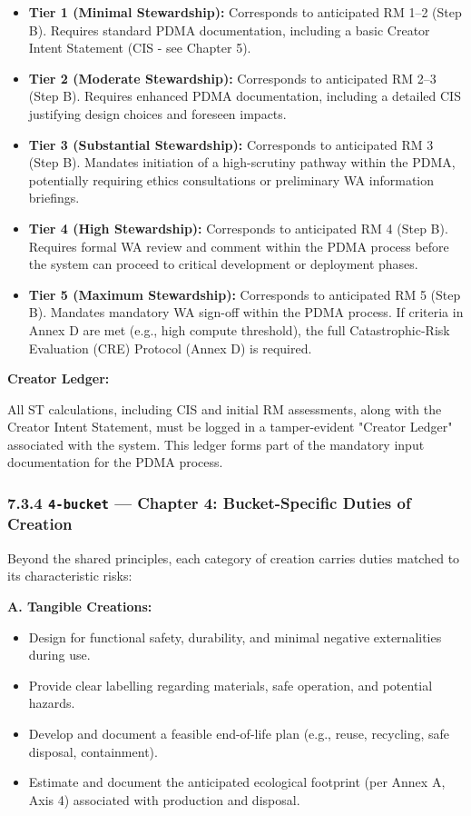 \documentclass[11pt]{article}
\begin{document}
\begin{itemize}\setlength\itemsep{0pt}
\item \textbf{Tier 1 (Minimal Stewardship):} Corresponds to anticipated RM 1–2 (Step B). Requires standard PDMA documentation, including a basic Creator Intent Statement (CIS - see Chapter 5).
\item \textbf{Tier 2 (Moderate Stewardship):} Corresponds to anticipated RM 2–3 (Step B). Requires enhanced PDMA documentation, including a detailed CIS justifying design choices and foreseen impacts.
\item \textbf{Tier 3 (Substantial Stewardship):} Corresponds to anticipated RM 3 (Step B). Mandates initiation of a high-scrutiny pathway within the PDMA, potentially requiring ethics consultations or preliminary WA information briefings.
\item \textbf{Tier 4 (High Stewardship):} Corresponds to anticipated RM 4 (Step B). Requires formal WA review and comment within the PDMA process before the system can proceed to critical development or deployment phases.
\item \textbf{Tier 5 (Maximum Stewardship):} Corresponds to anticipated RM 5 (Step B). Mandates mandatory WA sign-off within the PDMA process. If criteria in Annex D are met (e.g., high compute threshold), the full Catastrophic-Risk Evaluation (CRE) Protocol (Annex D) is required.
\end{itemize}


\textbf{Creator Ledger:}

All ST calculations, including CIS and initial RM assessments, along with the Creator Intent Statement, must be logged in a tamper-evident "Creator Ledger" associated with the system. This ledger forms part of the mandatory input documentation for the PDMA process.


\subsubsection*{7.3.4 \texttt{4-bucket} — Chapter 4: Bucket-Specific Duties of Creation}


Beyond the shared principles, each category of creation carries duties matched to its characteristic risks:


\textbf{A. Tangible Creations:}

\begin{itemize}\setlength\itemsep{0pt}
\item Design for functional safety, durability, and minimal negative externalities during use.
\item Provide clear labelling regarding materials, safe operation, and potential hazards.
\item Develop and document a feasible end-of-life plan (e.g., reuse, recycling, safe disposal, containment).
\item Estimate and document the anticipated ecological footprint (per Annex A, Axis 4) associated with production and disposal.
\end{itemize}
\end{document}
